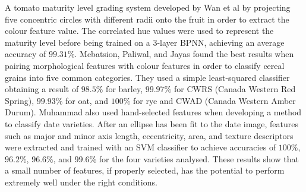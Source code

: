 \documentclass[fleqn,twoside,12pt]{report}
\begin{document}
A tomato maturity level grading system developed by Wan et al \cite{wan} by projecting five concentric circles with different radii onto the fruit in order to extract the colour feature value. The correlated hue values were used to represent the maturity level before being trained on a 3-layer BPNN, achieving an average accuracy of $99.31\%$. Mebatsion, Paliwal, and Jayas \cite{mebatsion} found the best results when pairing morphological features with colour features in order to classify cereal grains into five common categories. They used a simple least-squared classifier obtaining a result of $98.5\%$ for barley, $99.97\%$ for CWRS (Canada Western Red Spring), $99.93\%$ for oat, and $100\%$ for rye and CWAD (Canada Western Amber Durum). Muhammad \cite{muhammad} also used hand-selected features when developing a method to classify date varieties. After an ellipse has been fit to the date image, features such as major and minor axis length, eccentricity, area, and texture descriptors were extracted and trained with an SVM classifier to achieve accuracies of $100\%$, $96.2\%$, $96.6\%$, and $99.6\%$ for the four varieties analysed. These results show that a small number of features, if properly selected, has the potential to perform extremely well under the right conditions.
\end{document}
